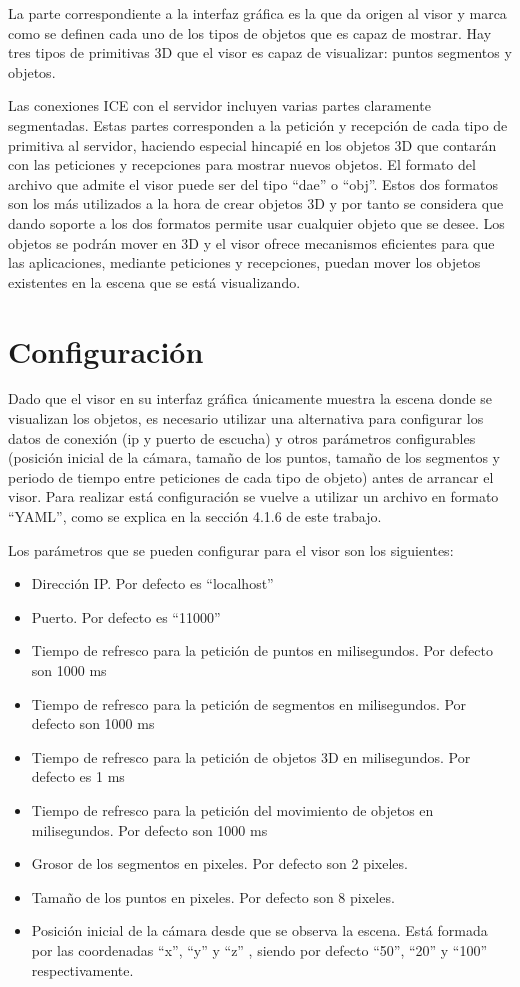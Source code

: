 La parte correspondiente a la interfaz gráfica es la que da origen al visor y marca como se definen cada uno de los tipos de objetos que es capaz de mostrar. Hay tres tipos de primitivas 3D que el visor es capaz de visualizar: puntos segmentos y objetos.

Las conexiones ICE con el servidor incluyen varias partes claramente segmentadas. Estas partes corresponden a la petición y recepción de cada tipo de primitiva al servidor, haciendo especial hincapié en los objetos 3D que contarán con las peticiones y recepciones para mostrar nuevos objetos. El formato del archivo que admite el visor puede ser del tipo ``dae'' o ``obj''. Estos dos formatos son los más utilizados a la hora de crear objetos 3D y por tanto se considera que dando soporte a los dos formatos permite usar cualquier objeto que se desee. Los objetos se podrán mover en 3D y el visor ofrece mecanismos eficientes para que las aplicaciones, mediante  peticiones y recepciones, puedan mover los objetos existentes en la escena que se está visualizando.

\section{Configuración}
Dado que el visor en su interfaz gráfica únicamente muestra la escena donde se visualizan los objetos, es necesario utilizar una alternativa para configurar los datos de conexión (ip y puerto de escucha) y otros parámetros configurables (posición inicial de la cámara, tamaño de los puntos, tamaño de los segmentos y periodo de tiempo entre peticiones de cada tipo de objeto) antes de arrancar el visor. Para realizar está configuración se vuelve a utilizar un archivo en formato ``YAML'', como se explica en la sección 4.1.6 de este trabajo.

Los parámetros que se pueden configurar para el visor son los siguientes:
\begin{itemize}
\item Dirección IP. Por defecto es ``localhost''
\item Puerto. Por defecto es ``11000''
\item Tiempo de refresco para la petición de puntos en milisegundos. Por defecto son 1000 ms
\item Tiempo de refresco para la petición de segmentos en milisegundos. Por defecto son 1000 ms
\item Tiempo de refresco para la petición de objetos 3D en milisegundos. Por defecto es 1 ms
\item Tiempo de refresco para la petición del movimiento de objetos en milisegundos. Por defecto son 1000 ms
\item Grosor de los segmentos en pixeles. Por defecto son 2 pixeles.
\item Tamaño de los puntos en pixeles. Por defecto son 8 pixeles.
\item Posición inicial de la cámara desde que se observa la escena. Está formada por las coordenadas ``x'', ``y'' y ``z'' , siendo por defecto ``50'', ``20'' y ``100'' respectivamente.
\end{itemize}

